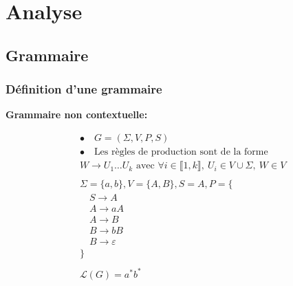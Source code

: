 \section{Analyse}

\subsection{Grammaire}
\begin{frame}
    \frametitle{Définition d'une grammaire\esp}

    \textbf{Grammaire non contextuelle:}
    \begin{minipage}[t]{0.7\textwidth}
        \vspace{-1.5em}
        \begin{align*}
            &\bullet\quad G = (\Sigma, V, P, S) \\
            &\bullet\quad \text{Les règles de production sont de la forme}\\
            & W \rightarrow U_1 \dots U_k \text{ avec } \forall i \in \llbracket 1, k \rrbracket,\ U_i \in V \cup \Sigma,\ W \in V \\
            \\[-2ex]
            &\Sigma = \{a,b\}, V = \{A,B\}, S = A, P = \{\\
            &\quad S \rightarrow A \\
            &\quad A \rightarrow aA \\
            &\quad A \rightarrow B \\
            &\quad B \rightarrow bB \\
            &\quad B \rightarrow \varepsilon \\
            &\}\\
            \\[-2ex]
            &\mathcal{L}(G) = a^* b^*
        \end{align*}
    \end{minipage}
    
\end{frame}


